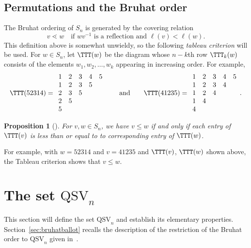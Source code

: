 \documentclass[12pt]{article}
\newtheorem{prop}[equation]{Proposition}
\theoremstyle{definition}
\theoremstyle{remark}
\numberwithin{equation}{section}
\newcommand{\QSV}{\mathrm{QSV}}
\begin{document}
\subsection{Permutations and the Bruhat order}
\label{sec:bruhat}

The Bruhat ordering of $S_{n}$ is generated by the covering relation 
\[
v \lessdot w \quad\text{if $wv^{-1}$ is a reflection and $\ell(v) < \ell(w)$}.
\]
This definition above is somewhat unwieldy, so the following \emph{tableau criterion} will be used.  For $w \in S_{n}$, let $\TTT(w)$ be the diagram whose $n-k$th row $\TTT_{k}(w)$ consists of the elements $w_{1}, w_{2}, \ldots, w_{k}$ appearing in increasing order.  For example,
\[
\TTT(52314) = 
\begin{array}{ccccc} 
1 & 2 & 3 & 4 & 5 \\ 
1 & 2 & 3 & 5 \\ 
2 & 3 & 5 \\ 
2 & 5 \\ 
5
\end{array}
\qquad\text{and}\qquad
\TTT(41235) = \begin{array}{ccccc} 
1 & 2 & 3 & 4 & 5 \\ 
1 & 2 & 3 & 4 \\ 
1 & 2 & 4 \\ 
1 & 4 \\ 
4
\end{array}.
\]

\begin{prop}[{\cite[Theorem 2.6.3]{BjornerBrenti}}]
\label{TableauCriterion}
For $v, w \in S_{n}$, we have $v \le w$  if and only if each entry of $\TTT(v)$ is less than or equal to to corresponding entry of $\TTT(w)$.
\end{prop}

For example, with $w = 52314$ and $v = 41235$ and $\TTT(v)$, $\TTT(w)$ shown above, the Tableau criterion shows that $v \le w$.

\section{The set $\QSV_{n}$}
\label{sec:QSV}

This section will define the set $\QSV_{n}$ and establish its elementary properties.  Section~\ref{sec:bruhatballot} recalls the description of the restriction of the Bruhat order to $\QSV_{n}$ given in~\cite{GobetWilliams}.
\end{document}

